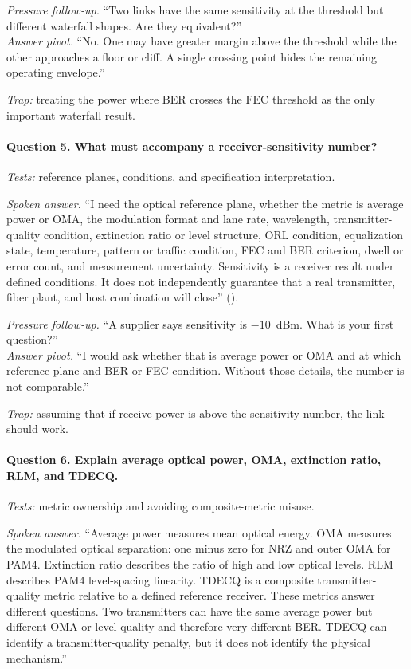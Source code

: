 \textit{Pressure follow-up.} ``Two links have the same sensitivity at the
threshold but different waterfall shapes. Are they equivalent?''\\
\textit{Answer pivot.} ``No. One may have greater margin above the threshold
while the other approaches a floor or cliff. A single crossing point hides the
remaining operating envelope.''

\textit{Trap:} treating the power where BER crosses the FEC threshold as the
only important waterfall result.

\paragraph{Question 5. What must accompany a receiver-sensitivity number?}
\textit{Tests:} reference planes, conditions, and specification interpretation.

\textit{Spoken answer.}
``I need the optical reference plane, whether the metric is average power or
OMA, the modulation format and lane rate, wavelength, transmitter-quality
condition, extinction ratio or level structure, ORL condition, equalization
state, temperature, pattern or traffic condition, FEC and BER criterion, dwell
or error count, and measurement uncertainty. Sensitivity is a receiver result
under defined conditions. It does not independently guarantee that a real
transmitter, fiber plant, and host combination will close''
().

\textit{Pressure follow-up.} ``A supplier says sensitivity is $-10$~dBm. What is
your first question?''\\
\textit{Answer pivot.} ``I would ask whether that is average power or OMA and at
which reference plane and BER or FEC condition. Without those details, the
number is not comparable.''

\textit{Trap:} assuming that if receive power is above the sensitivity number,
the link should work.

\paragraph{Question 6. Explain average optical power, OMA, extinction ratio,
RLM, and TDECQ.}
\textit{Tests:} metric ownership and avoiding composite-metric misuse.

\textit{Spoken answer.}
``Average power measures mean optical energy. OMA measures the modulated optical
separation: one minus zero for NRZ and outer OMA for PAM4. Extinction ratio
describes the ratio of high and low optical levels. RLM describes PAM4
level-spacing linearity. TDECQ is a composite transmitter-quality metric relative
to a defined reference receiver. These metrics answer different questions. Two
transmitters can have the same average power but different OMA or level quality
and therefore very different BER. TDECQ can identify a transmitter-quality
penalty, but it does not identify the physical mechanism.''

